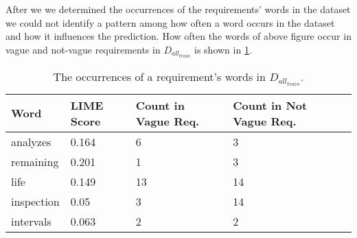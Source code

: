 \newpage %
After we we determined the occurrences of the requirements' words in the dataset we could not identify a pattern among how often a word occurs in the dataset and how it influences the prediction.
How often the words of above figure occur in vague and not-vague requirements in $D_{all_{train}}$ is shown in \cref{tab:study:interpretation:LIME}.
\begin{table}[htpb]
    \centering
    \begin{tabular}{l l l l l }
        \toprule
         Word & \ac{LIME} Score & Count in Vague Req. & Count in Not Vague Req. \\
        \midrule
        analyzes & 0.164 & 6 & 3 \\
        remaining & 0.201 & 1 & 3  \\
        life &  0.149 & 13 & 14\\
        inspection & 0.05 & 3 & 14 \\
        intervals & 0.063 & 2 & 2 \\
        \bottomrule
    \end{tabular}
    \caption[Study Interpretation: Word Occurrences]{The occurrences of a requirement's words in $D_{all_{train}}$.}\label{tab:study:interpretation:LIME}
\end{table}


